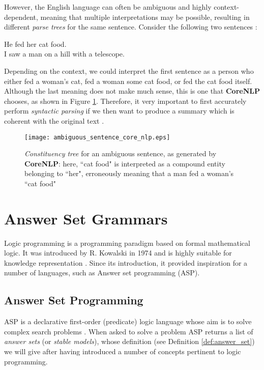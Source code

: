 \noindent
However, the English language can often be ambiguous and highly context-dependent, meaning that multiple interpretations may be possible, resulting in different \textit{parse trees} for the same sentence. Consider the following two sentences \cite{noauthor_studying_nodate}:

\begin{displayquote}
He fed her cat food. \\
I saw a man on a hill with a telescope.
\end{displayquote}

\noindent
Depending on the context, we could interpret the first sentence as a person who either fed a woman's cat, fed a woman some cat food, or fed the cat food itself. Although the last meaning does not make much sense, this is one that \textbf{CoreNLP} chooses, as shown in Figure \ref{fig:dependency_tree_ambiguous_sentence}. Therefore, it very important to first accurately perform \textit{syntactic parsing} if we then want to produce a summary which is coherent with the original text \cite{gomez-rodriguez_how_2019}.

\begin{figure}[H]
\centering
\texttt{[image: ambiguous\_sentence\_core\_nlp.eps]}
\caption{\textit{Constituency tree} for an ambiguous sentence, as generated by  \textbf{CoreNLP}: here, ``cat food" is interpreted as a compound entity belonging to ``her", erroneously meaning that a man fed a woman's ``cat food"}
\label{fig:dependency_tree_ambiguous_sentence}
\end{figure}

\section{Answer Set Grammars}
\label{sec:asg}

Logic programming is a programming paradigm based on formal mathematical logic. It was introduced by R. Kowalski in 1974 and is highly suitable for knowledge representation \cite{apt_logic_1990}. Since its introduction, it provided inspiration for a number of languages, such as Answer set programming (ASP).

\subsection{Answer Set Programming}

ASP is a declarative first-order (predicate) logic language whose aim is to solve complex search problems \cite{lifschitz_what_nodate}. When asked to solve a problem ASP returns a list of \textit{answer sets} (or \textit{stable models}), whose definition (see Definition \ref{def:answer_set}) we will give after having introduced a number of concepts pertinent to logic programming.


